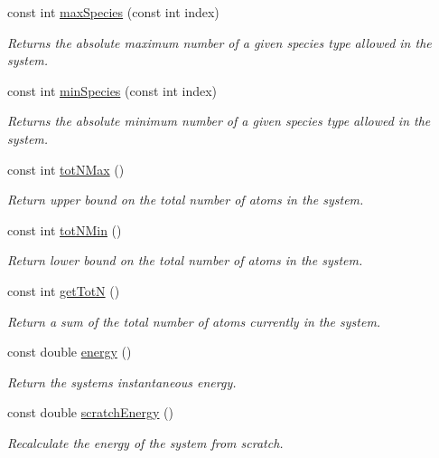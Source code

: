 \begin{DoxyCompactItemize}
const int \hyperlink{classsim_system_a93259b517f449f1ac610d132ac66b551}{max\+Species} (const int index)
\begin{DoxyCompactList}\small\item\em Returns the absolute maximum number of a given species type allowed in the system. \end{DoxyCompactList}\item 
const int \hyperlink{classsim_system_afafda4a09ed180ee9c5580d196d8ca9f}{min\+Species} (const int index)
\begin{DoxyCompactList}\small\item\em Returns the absolute minimum number of a given species type allowed in the system. \end{DoxyCompactList}\item 
const int \hyperlink{classsim_system_aee2c65ecb43a35c0c4d070cdb45f7dc0}{tot\+N\+Max} ()
\begin{DoxyCompactList}\small\item\em Return upper bound on the total number of atoms in the system. \end{DoxyCompactList}\item 
const int \hyperlink{classsim_system_af10842e0eaa638373b8717c87b47e6bc}{tot\+N\+Min} ()
\begin{DoxyCompactList}\small\item\em Return lower bound on the total number of atoms in the system. \end{DoxyCompactList}\item 
const int \hyperlink{classsim_system_a37dd827f4057049763351510147b9f1d}{get\+Tot\+N} ()
\begin{DoxyCompactList}\small\item\em Return a sum of the total number of atoms currently in the system. \end{DoxyCompactList}\item 
const double \hyperlink{classsim_system_a37b3d15faf56bf31349f5c2aaf02f858}{energy} ()
\begin{DoxyCompactList}\small\item\em Return the system\textquotesingle{}s instantaneous energy. \end{DoxyCompactList}\item 
const double \hyperlink{classsim_system_a51539ed4c3bb4905b32ce428c1c537fe}{scratch\+Energy} ()
\begin{DoxyCompactList}\small\item\em Recalculate the energy of the system from scratch. \end{DoxyCompactList}\item 

\end{DoxyCompactItemize}
